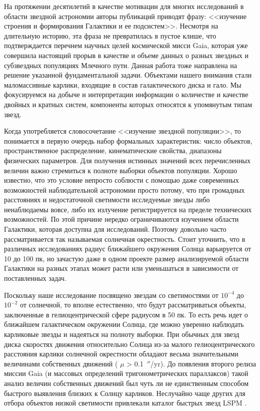 {\actuality} На протяжении десятилетий в качестве мотивации для многих исследований в области звездной астрономии авторы публикаций приводят фразу: <<изучение строения и формирования Галактики и ее подсистем>>. Несмотря на длительную историю, эта фраза не превратилась в пустое клише, что подтверждается перечнем научных целей космической мисси Gaia, которая уже совершила настоящий прорыв в качестве и объеме данных о разных звездных и субзвездных популяциях Млечного пути. Данная работа тоже направлена на решение указанной фундаментальной задачи. Объектами нашего внимания стали маломассивные карлики, входящие в состав галактического диска и гало. Мы фокусируемся на добыче и интерпретации информации о количестве и качестве двойных и кратных систем, компоненты которых относятся к упомянутым типам звезд.

Когда употребляется словосочетание <<изучение звездной популяции>>, то понимается в первую очередь набор формальных характеристик: число объектов, пространственное распределение, кинематические свойства, диапазоны физических параметров. Для получения истинных значений всех перечисленных величин важно стремиться к полноте выборки объектов популяции. Хорошо известно, что это условие непросто соблюсти с помощью даже современных возможностей наблюдательной астрономии просто потому, что при громадных расстояниях и недостаточной светимости исследуемые звезды либо ненаблюдаемы вовсе, либо их излучение регистрируется на пределе технических возможностей. По этой причине нередко ограничиваются изучением области Галактики, которая доступна для исследований. Поэтому довольно часто рассматривается так называемая солнечная окрестность. Стоит уточнить, что в различных исследованиях радиус ближайшего окружения  Солнца варьируется от 10 до 100 пк, но зачастую даже в одном проекте размер анализируемой области Галактики на разных этапах может расти или уменьшаться в зависимости от поставленных задач.

Поскольку наше исследование посвящено звездам со светимостями от $10^{-4}$ до $10^{-2}$ от солнечной, то вполне естественно, что будут рассматриваться объекты, заключенные в гелиоцентрической сфере радиусом в 50 пк. То есть речь идет о ближайшем галактическом окружении Солнца, где можно уверенно наблюдать карликовые звезды и надеяться на полноту выборки. При обычных для звезд диска скоростях движения относительно Солнца из-за малого гелиоцентрического расстояния карлики солнечной окрестности обладают весьма значительными величинами собственных движений ( $\mu$ > 0.1~$''$/yr). До появления второго релиза миссии Gaia (и массовых определений тригонометрических параллаксов) такой анализ величин собственных движений был чуть ли не единственным способом быстрого выявления близких к Солнцу карликов. Неслучайно чаще других для отбора объектов низкой светимости привлекали каталог быстрых звезд LSPM \cite{2005AJ....129.1483L}. 
 
